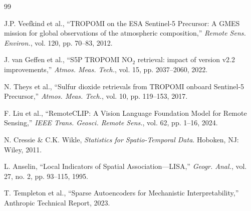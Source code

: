 \documentclass[10pt,a4paper,twocolumn]{article}
\begin{document}
\begin{thebibliography}{99}

\scriptsize J.P. Veefkind et al., ``TROPOMI on the ESA Sentinel-5 Precursor: A GMES mission for global observations of the atmospheric composition,'' \emph{Remote Sens. Environ.}, vol. 120, pp. 70--83, 2012.

\scriptsize J. van Geffen et al., ``S5P TROPOMI NO$_2$ retrieval: impact of version v2.2 improvements,'' \emph{Atmos. Meas. Tech.}, vol. 15, pp. 2037--2060, 2022.

\scriptsize N. Theys et al., ``Sulfur dioxide retrievals from TROPOMI onboard Sentinel-5 Precursor,'' \emph{Atmos. Meas. Tech.}, vol. 10, pp. 119--153, 2017.

\scriptsize F. Liu et al., ``RemoteCLIP: A Vision Language Foundation Model for Remote Sensing,'' \emph{IEEE Trans. Geosci. Remote Sens.}, vol. 62, pp. 1--16, 2024.

\scriptsize N. Cressie \& C.K. Wikle, \emph{Statistics for Spatio-Temporal Data}. Hoboken, NJ: Wiley, 2011.

\scriptsize L. Anselin, ``Local Indicators of Spatial Association---LISA,'' \emph{Geogr. Anal.}, vol. 27, no. 2, pp. 93--115, 1995.

\scriptsize T. Templeton et al., ``Sparse Autoencoders for Mechanistic Interpretability,'' Anthropic Technical Report, 2023.

\end{thebibliography}

\label{LastPage}
\end{document}
